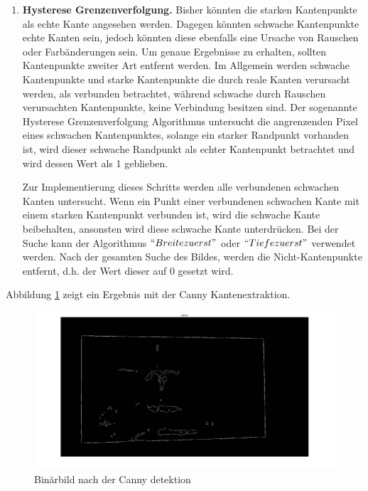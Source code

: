 \begin{enumerate}
	\item \textbf{Hysterese Grenzenverfolgung.} Bisher könnten die starken Kantenpunkte als echte Kante angesehen werden. Dagegen könnten schwache Kantenpunkte echte Kanten sein, jedoch könnten diese ebenfalls eine Ursache von Rauschen oder Farbänderungen sein. Um genaue Ergebnisse zu erhalten, sollten Kantenpunkte zweiter Art entfernt werden. Im Allgemein werden schwache Kantenpunkte und starke Kantenpunkte die durch reale Kanten verursacht werden, als verbunden betrachtet, während schwache durch Rauschen verursachten Kantenpunkte, keine Verbindung besitzen sind. Der sogenannte Hysterese Grenzenverfolgung Algorithmus untersucht die angrenzenden Pixel eines schwachen Kantenpunktes, solange ein starker Randpunkt vorhanden ist, wird dieser schwache Randpunkt als echter Kantenpunkt betrachtet und wird dessen Wert als 1 geblieben.
	
Zur Implementierung dieses Schritts werden alle verbundenen schwachen Kanten untersucht. Wenn ein Punkt einer verbundenen schwachen Kante mit einem starken Kantenpunkt verbunden ist, wird die schwache Kante beibehalten, ansonsten wird diese schwache Kante unterdrücken. Bei der Suche kann der Algorithmus $ ``Breite zuerst" $ oder $ ``Tiefe zuerst" $ verwendet werden. Nach der gesamten Suche des Bildes, werden die Nicht-Kantenpunkte entfernt, d.h. der Wert dieser auf 0 gesetzt wird.
	
\end{enumerate}

Abbildung \ref{fig:Binärbild nach der Canny detektion} zeigt ein Ergebnis mit der Canny Kantenextraktion.

\begin{figure}[H]
 \centering 
  \includegraphics[keepaspectratio,width=1.0\textwidth]{images/4_ZweiteErfahrung/Canny/canny.pdf}
 \caption{Binärbild nach der Canny detektion}
 \label{fig:Binärbild nach der Canny detektion}
\end{figure} 

